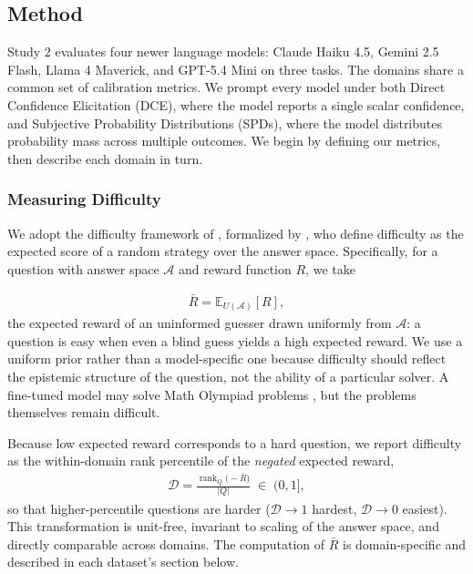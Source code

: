 \documentclass{article}
\begin{document}
\subsection{Method}
\label{sec:methods}

Study 2 evaluates four newer language models: Claude Haiku 4.5, Gemini 2.5 Flash, Llama 4 Maverick, and GPT-5.4 Mini on three tasks. The domains share a common set of calibration metrics. We prompt every model under both Direct Confidence Elicitation (DCE), where the model reports a single scalar confidence, and Subjective Probability Distributions (SPDs), where the model distributes probability mass across multiple outcomes. We begin by defining our metrics, then describe each domain in turn.


\subsubsection{Measuring Difficulty}
\label{sec:difficulty}

We adopt the difficulty framework of \citet{elee}, formalized by \citet{littlewood_difficulty}, who define difficulty as the expected score of a random strategy over the answer space. Specifically, for a question with answer space $\mathcal{A}$ and reward function $R$, we take

\begin{align}
    \bar{R} = \mathbb{E}_{U(\mathcal{A})}[R],
\end{align}
the expected reward of an uninformed guesser drawn uniformly from $\mathcal{A}$: a question is easy when even a blind guess yields a high expected reward. We use a uniform prior rather than a model-specific one because difficulty should reflect the epistemic structure of the question, not the ability of a particular solver. A fine-tuned model may solve Math Olympiad problems \citep{goog_imo}, but the problems themselves remain difficult.

Because low expected reward corresponds to a hard question, we report difficulty as the within-domain rank percentile of the \emph{negated} expected reward,
\begin{align}
    \mathcal{D} = \frac{\operatorname{rank}_Q\!\bigl(-\bar{R}\bigr)}{|Q|} \;\in\; (0,1],
\end{align}
so that higher-percentile questions are harder ($\mathcal{D}\to 1$ hardest, $\mathcal{D}\to 0$ easiest). This transformation is unit-free, invariant to scaling of the answer space, and directly comparable across domains. The computation of $\bar{R}$ is domain-specific and described in each dataset's section below.
\end{document}
